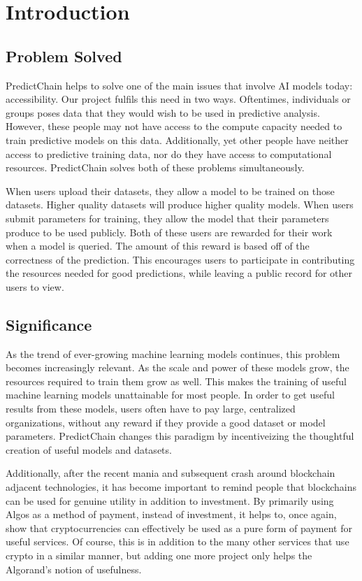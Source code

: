 \documentclass{ledger}
\begin{document}
\pagebreak

\section{Introduction}

\subsection{Problem Solved}

PredictChain helps to solve one of the main issues that involve AI models today: accessibility.  Our project fulfils this
need in two ways.  Oftentimes, individuals or groups poses data that they would wish to be used in predictive analysis.
However, these people may not have access to the compute capacity needed to train predictive models on this data.  Additionally,
yet other people have neither access to predictive training data, nor do they have access to computational resources.
PredictChain solves both of these problems simultaneously.

When users upload their datasets, they allow a model to be trained on those datasets.  Higher quality datasets will produce
higher quality models.  When users submit parameters for training, they allow the model that their parameters produce to
be used publicly.  Both of these users are rewarded for their work when a model is queried.  The amount of this reward
is based off of the correctness of the prediction.  This encourages users to participate in contributing the
resources needed for good predictions, while leaving a public record for other users to view.

\subsection{Significance}

As the trend of ever-growing machine learning models continues, this problem becomes increasingly relevant.
As the scale and power of these models grow, the resources required to train them grow as well.  This makes the training
of useful machine learning models unattainable for most people.  In order to get useful results from these models,
users often have to pay large, centralized organizations, without any reward if they provide a good dataset or model
parameters.  PredictChain changes this paradigm by incentiveizing the thoughtful creation of useful models and
datasets.

Additionally, after the recent mania and subsequent crash around blockchain adjacent technologies, it has become
important to remind people that blockchains can be used for genuine utility in addition to investment.  By primarily
using Algos as a method of payment, instead of investment, it helps to, once again, show that cryptocurrencies can
effectively be used as a pure form of payment for useful services.  Of course, this is in addition to the many other
services that use crypto in a similar manner, but adding one more project only helps the Algorand's notion of usefulness.
\end{document}
